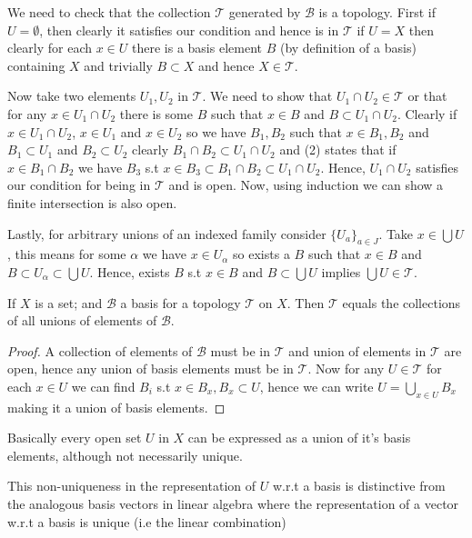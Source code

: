 \qquad We need to check that the collection $\mathcal{T}$ generated by $\mathcal{B}$ is a topology. First if $U = \emptyset$, then clearly it satisfies our condition and hence is in $\mathcal{T}$ if $U = X$ then clearly for each $x \in U $ there is a basis element $B$ (by definition of a basis) containing $X$ and trivially $B \subset X$ and hence $X \in \mathcal{T}$.

\vspace{1em}

Now take two elements $U_{1}, U_{2}$ in $\mathcal{T}$. We need to show that $U_{1} \cap U_{2}\in\mathcal{T}$ or that for any $x \in U_{1} \cap U_{2}$ there is some $B$ such that $x \in B$ and $B \subset U_{1} \cap U_{2}$. Clearly if $x \in U_{1} \cap U_{2}$, $x \in U_{1}$ and $x \in U_{2}$ so we have $B_{1}, B_{2}$ such that $x \in B_{1}, B_{2}$ and $B_{1} \subset U_{1}$ and $B_{2} \subset U_{2}$ clearly $B_{1} \cap B_{2} \subset U_{1} \cap U_{2}$ and (2) states that if $x \in B_{1} \cap B_{2}$ we have $B_{3}$ s.t $x \in B_{3} \subset B_{1} \cap B_{2} \subset U_{1} \cap U_{2}$. Hence, $U_{1} \cap U_{2}$ satisfies our condition for being in $\mathcal{T}$ and is open. Now, using induction we can show a finite intersection is also open.


\vspace{1em}

Lastly, for arbitrary unions of an indexed family consider $\{U_{a}\}_{a \in J}$. Take $x \in \bigcup U$, this means for some $\alpha$  we have $x \in U_{\alpha}$ so exists a $B$ such that $x \in B$ and $B \subset U_{\alpha} \subset \bigcup U$. Hence, exists $B$ s.t $x \in B$ and $B \subset \bigcup U$ implies $\bigcup U \in \mathcal{T}$.

\begin{lemma}
    If $X$ is a set; and $\mathcal{B}$ a basis for a topology $\mathcal{T}$ on $X$. Then $\mathcal{T}$ equals the collections of all unions of elements of $\mathcal{B}$.
\end{lemma}
\begin{proof}
    A collection of elements of $\mathcal{B}$ must be in $\mathcal{T}$ and union of elements in $\mathcal{T}$ are open, hence any union of basis elements must be in $\mathcal{T}$. Now for any $U \in \mathcal{T}$ for each $x \in U$ we can find $B_i$ s.t $x \in B_x, B_x \subset U$, hence we can write $U = \bigcup_{x  \in U} B_x$ making it a union of basis elements.
\end{proof}

\begin{remark}
    Basically every open set $U$ in $X$ can be expressed as a union of it's basis elements, although not necessarily unique.
\end{remark}
\begin{note}
    This non-uniqueness in the representation of $U$ w.r.t a basis is distinctive from the analogous basis vectors in linear algebra where the representation of a vector w.r.t a basis is unique (i.e the linear combination)
\end{note}


